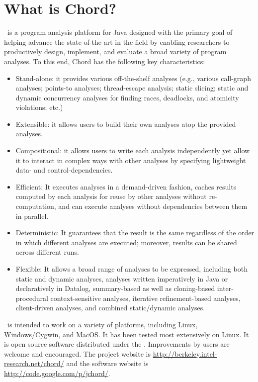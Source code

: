 \section{What is Chord?}
\label{sec:whatis-chord}

\Chord\ is a program analysis platform for Java designed with the
primary goal of helping advance the state-of-the-art in the field by
enabling researchers to productively design, implement, and evaluate a
broad variety of program analyses. To this end, Chord has the
following key characteristics:

\begin{itemize}
\item
Stand-alone: it provides various off-the-shelf analyses (e.g., various
call-graph analyses; points-to analyses; thread-escape analysis;
static slicing; static and dynamic concurrency analyses for finding
races, deadlocks, and atomicity violations; etc.)
\item
Extensible: it allows users to build their own analyses atop the
provided analyses.
\item
Compositional: it allows users to write each analysis independently
yet allow it to interact in complex ways with other analyses by
specifying lightweight data- and control-dependencies.
\item
Efficient: It executes analyses in a demand-driven fashion, caches
results computed by each analysis for reuse by other analyses without
re-computation, and can execute analyses without dependencies between
them in parallel.
\item
Deterministic: It guarantees that the result is the same regardless of
the order in which different analyses are executed; moreover, results
can be shared across different runs.
\item
Flexible: It allows a broad range of analyses to be expressed,
including both static and dynamic analyses, analyses written
imperatively in Java or declaratively in Datalog, summary-based as
well as cloning-based inter-procedural context-sensitive analyses,
iterative refinement-based analyses, client-driven analyses, and
combined static/dynamic analyses.
\end{itemize}

\noindent \Chord\ is intended to work on a variety of platforms,
including Linux, Windows/Cygwin, and MacOS.  It has been tested most
extensively on Linux.  It is open source software distributed under
the .
Improvements by users are welcome and encouraged.  The project website
is \url{http://berkeley.intel-research.net/chord/} and the software
website is \url{http://code.google.com/p/jchord/}.


